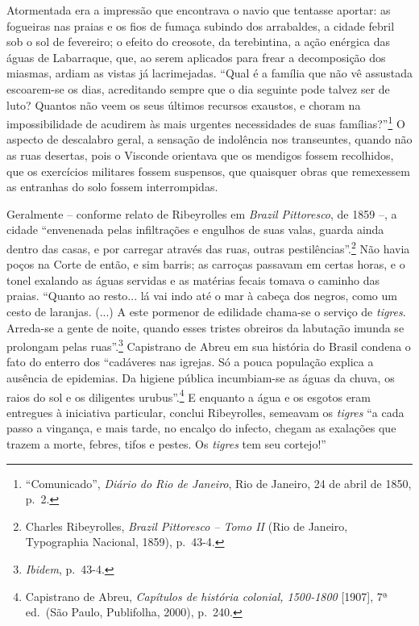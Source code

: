 Atormentada era a impressão que encontrava o navio que tentasse aportar:
as fogueiras nas praias e os fios de fumaça subindo dos arrabaldes, a
cidade febril sob o sol de fevereiro; o efeito do creosote, da
terebintina, a ação enérgica das águas de Labarraque, que, ao serem
aplicados para frear a decomposição dos miasmas, ardiam as vistas já
lacrimejadas. ``Qual é a família que não vê assustada escoarem-se os
dias, acreditando sempre que o dia seguinte pode talvez ser de luto?
Quantos não veem os seus últimos recursos exaustos, e choram na
impossibilidade de acudirem às mais urgentes necessidades de suas
famílias?''\footnote{``Comunicado'', \emph{Diário do Rio de Janeiro},
  Rio de Janeiro, 24 de abril de 1850, p.~2.} O aspecto de descalabro
geral, a sensação de indolência nos transeuntes, quando não as ruas
desertas, pois o Visconde orientava que os mendigos fossem recolhidos,
que os exercícios militares fossem suspensos, que quaisquer obras que
remexessem as entranhas do solo fossem interrompidas.

Geralmente -- conforme relato de Ribeyrolles em \emph{Brazil
Pittoresco}, de 1859 --, a cidade ``envenenada pelas infiltrações e
engulhos de suas valas, guarda ainda dentro das casas, e por carregar
através das ruas, outras pestilências''.\footnote{Charles Ribeyrolles,
  \emph{Brazil Pittoresco -- Tomo II} (Rio de Janeiro, Typographia
  Nacional, 1859), p.~43-4.} Não havia poços na Corte de então, e sim
barris; as carroças passavam em certas horas, e o tonel exalando as
águas servidas e as matérias fecais tomava o caminho das praias.
``Quanto ao resto... lá vai indo até o mar à cabeça dos negros, como um
cesto de laranjas. (...) A este pormenor de edilidade chama-se o serviço
de \emph{tigres}. Arreda-se a gente de noite, quando esses tristes
obreiros da labutação imunda se prolongam pelas ruas''.\footnote{\emph{Ibidem},
  p.~43-4.} Capistrano de Abreu em sua história do Brasil condena o fato
do enterro dos ``cadáveres nas igrejas. Só a pouca população explica a
ausência de epidemias. Da higiene pública incumbiam-se as águas da
chuva, os raios do sol e os diligentes urubus''.\footnote{Capistrano de
  Abreu, \emph{Capítulos de história colonial, 1500-1800} {[}1907{]}, 7ª
  ed.~(São Paulo, Publifolha, 2000), p.~240.} E enquanto a água e os
esgotos eram entregues à iniciativa particular, conclui Ribeyrolles,
semeavam os \emph{tigres} ``a cada passo a vingança, e mais tarde, no
encalço do infecto, chegam as exalações que trazem a morte, febres,
tifos e pestes. Os \emph{tigres} tem seu cortejo!''

